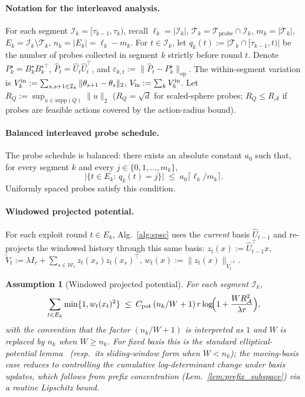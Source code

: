 \documentclass{article}
\newcommand{\op}{\mathrm{op}}
\newcommand{\cA}{\mathcal{A}}
\newcommand{\cT}{\mathcal{T}}
\newcommand{\cI}{\mathcal{I}}
\newcommand{\cW}{\mathcal{W}}
\newcommand{\cTprobe}{\mathcal{T}_{\mathrm{probe}}}
\newtheorem{assumption}[theorem]{Assumption}
\begin{document}
\paragraph{Notation for the interleaved analysis.}
For each segment $\cI_k=[\tau_{k-1},\tau_k)$, recall
$\ell_k=|\cI_k|$, $\cT_k=\cTprobe\cap\cI_k$, $m_k=|\cT_k|$,
$E_k=\cI_k\setminus\cT_k$, $n_k=|E_k|=\ell_k-m_k$. For
$t\in\cI_k$, let $q_k(t):=|\cT_k\cap[\tau_{k-1},t)|$ be the number
of probes collected in segment $k$ strictly before round $t$.
Denote $P_k^\star=B_k^\star B_k^{\star\top}$,
$\widehat P_t=\widehat U_t\widehat U_t^\top$, and
$\varepsilon_{k,t}:=\|\widehat P_t-P_k^\star\|_{\op}$. The
within-segment variation is
$V_k^{\rm in}:=\sum_{s,s+1\in\cI_k}\|\theta_{s+1}-\theta_s\|_2$,
$V_{\rm in}:=\sum_k V_k^{\rm in}$. Let
$R_Q:=\sup_{u\in\mathrm{supp}(Q)}\|u\|_2$ ($R_Q=\sqrt d$ for
scaled-sphere probes; $R_Q\le R_\cA$ if probes are feasible
actions covered by the action-radius bound).

\paragraph{Balanced interleaved probe schedule.}
The probe schedule is balanced: there exists an absolute constant
$a_0$ such that, for every segment $k$ and every
$j\in\{0,1,\dots,m_k\}$,
\begin{equation}
\bigl|\{t\in E_k:\,q_k(t)=j\}\bigr|
\;\le\; a_0\bigl\lceil\ell_k/m_k\bigr\rceil.
\tag{B}\label{eq:balanced}
\end{equation}
Uniformly spaced probes satisfy this condition.

\paragraph{Windowed projected potential.}
For each exploit round $t\in E_k$, Alg.~\ref{alg:spsc} uses the
\emph{current} basis $\widehat U_{t-1}$ and re-projects the windowed
history through this same basis: $z_t(x):=\widehat U_{t-1}^\top x$,
$\widetilde V_t:=\lambda I_r+\sum_{s\in\cW_t}z_t(x_s)z_t(x_s)^\top$,
$w_t(x):=\|z_t(x)\|_{\widetilde V_t^{-1}}$.

\begin{assumption}[Windowed projected potential]
\label{ass:projected_potential}
For each segment $\cI_k$,
\begin{equation}
\sum_{t\in E_k}\min\{1,w_t(x_t)^2\}
\;\le\; C_{\rm pot}\,(n_k/W+1)\,r\log\!\Bigl(1+\frac{W R_\cA^2}{\lambda r}\Bigr),
\label{eq:projected_potential}
\end{equation}
with the convention that the factor $(n_k/W+1)$ is interpreted as $1$
and $W$ is replaced by $n_k$ when $W\ge n_k$.
For fixed basis this is the standard elliptical-potential
lemma~\citep[Lem.~11]{abbasi2011improved} (resp.\ its sliding-window
form when $W<n_k$); the moving-basis case reduces to controlling the
cumulative log-determinant change under basis updates, which follows
from prefix concentration (Lem.~\ref{lem:prefix_subspace}) via a
routine Lipschitz bound.
\end{assumption}
\end{document}
